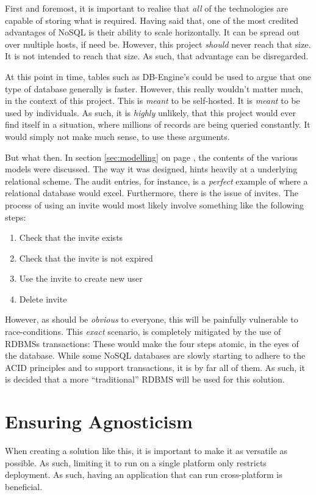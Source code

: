 		First and foremost, it is important to realise that \emph{all} of the technologies are capable of storing what is required. Having said that, one of the most credited advantages of NoSQL is their ability to scale horizontally. It can be spread out over multiple hosts, if need be. However, this project \emph{should} never reach that size. It is not intended to reach that size. As such, that advantage can be disregarded.

		At this point in time, tables such as DB-Engine's\cite{db_rankings} could be used to argue that one type of database generally is faster. However, this really wouldn't matter much, in the context of this project. This is \emph{meant} to be self-hosted. It is \emph{meant} to be used by individuals. As such, it is \emph{highly} unlikely, that this project would ever find itself in a situation, where millions of records are being queried constantly. It would simply not make much sense, to use these arguments.

		But what then. In section \ref{sec:modelling} on page \pageref{sec:modelling}, the contents of the various models were discussed. The way it was designed, hints heavily at a underlying relational scheme. The audit entries, for instance, is a \emph{perfect} example of where a relational database would excel. Furthermore, there is the issue of invites. The process of using an invite would most likely involve something like the following steps:
		\begin{enumerate}
			\item Check that the invite exists
			\item Check that the invite is not expired
			\item Use the invite to create new user
			\item Delete invite
		\end{enumerate}
		However, as should be \emph{obvious} to everyone, this will be painfully vulnerable to race-conditions. This \emph{exact} scenario, is completely mitigated by the use of RDBMSs transactions: These would make the four steps atomic, in the eyes of the database. While some NoSQL databases are slowly starting to adhere to the ACID principles and to support transactions, it is by far all of them. As such, it is decided that a more ``traditional'' RDBMS will be used for this solution.

	\section{Ensuring Agnosticism}
		When creating a solution like this, it is important to make it as versatile as possible. As such, limiting it to run on a single platform only restricts deployment. As such, having an application that can run cross-platform is beneficial.

